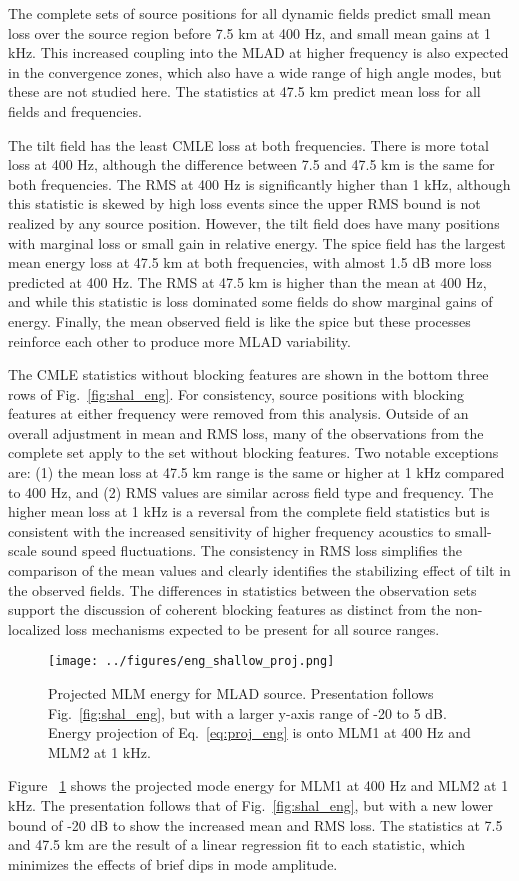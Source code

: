\documentclass[preprint,NumberedRefs]{JASA}
\begin{document}
The complete sets of source positions for all dynamic fields predict small mean loss over the source region before 7.5 km at 400 Hz, and small mean gains at 1 kHz. This increased coupling into the MLAD at higher frequency is also expected in the convergence zones, which also have a wide range of high angle modes, but these are not studied here. The statistics at 47.5 km predict mean loss for all fields and frequencies.

The tilt field has the least CMLE loss at both frequencies. There is more total loss at 400 Hz, although the difference between 7.5 and 47.5 km is the same for both frequencies. The RMS at 400 Hz is significantly higher than 1 kHz, although this statistic is skewed by high loss events since the upper RMS bound is not realized by any source position. However, the tilt field does have many positions with marginal loss or small gain in relative energy. The spice field has the largest mean energy loss at 47.5 km at both frequencies, with almost 1.5 dB more loss predicted at 400 Hz. The RMS at 47.5 km is higher than the mean at 400 Hz, and while this statistic is loss dominated some fields do show marginal gains of energy. Finally, the mean observed field is like the spice but these processes reinforce each other to produce more MLAD variability.

The CMLE statistics without blocking features are shown in the bottom three rows of Fig.~\ref{fig:shal_eng}. For consistency, source positions with blocking features at either frequency were removed from this analysis. Outside of an overall adjustment in mean and RMS loss, many of the observations from the complete set apply to the set without blocking features. Two notable exceptions are: (1) the mean loss at 47.5 km range is the same or higher at 1 kHz compared to 400 Hz, and (2) RMS values are similar across field type and frequency. The higher mean loss at 1 kHz is a reversal from the complete field statistics but is consistent with the increased sensitivity of higher frequency acoustics to small-scale sound speed fluctuations. The consistency in RMS loss simplifies the comparison of the mean values and clearly identifies the stabilizing effect of tilt in the observed fields. The differences in statistics between the observation sets support the discussion of coherent blocking features as distinct from the non-localized loss mechanisms expected to be present for all source ranges.

\begin{figure}
\texttt{[image: ../figures/eng\_shallow\_proj.png]}
    \caption{Projected MLM energy for MLAD source. Presentation follows Fig.~\ref{fig:shal_eng}, but with a larger y-axis range of -20 to 5 dB. Energy projection of Eq.~\eqref{eq:proj_eng} is onto MLM1 at 400 Hz and MLM2 at 1 kHz.}
    \label{fig:shal_proj}
\end{figure}
Figure ~\ref{fig:shal_proj} shows the projected mode energy for MLM1 at 400 Hz and MLM2 at 1 kHz. The presentation follows that of Fig.~\ref{fig:shal_eng}, but with a new lower bound of -20 dB to show the increased mean and RMS loss. The statistics at 7.5 and 47.5 km are the result of a linear regression fit to each statistic, which minimizes the effects of brief dips in mode amplitude.
\end{document}

